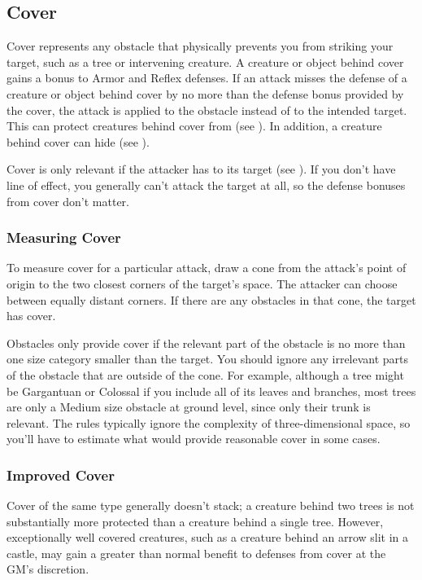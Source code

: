     \subsection{Cover}\label{Cover}

        Cover represents any obstacle that physically prevents you from striking your target, such as a tree or intervening creature.
        A creature or object behind cover gains a  bonus to Armor and Reflex defenses.
        If an attack misses the defense of a creature or object behind cover by no more than the defense bonus provided by the cover,
            the attack is applied to the obstacle instead of to the intended target.
        This can protect creatures behind cover from  (see ).
        In addition, a creature behind cover can hide (see ).

        Cover is only relevant if the attacker has  to its target (see ).
        If you don't have line of effect, you generally can't attack the target at all, so the defense bonuses from cover don't matter.

        \subsubsection{Measuring Cover}
            To measure cover for a particular attack, draw a cone from the attack's point of origin to the two closest corners of the target's space.
            The attacker can choose between equally distant corners.
            If there are any obstacles in that cone, the target has cover.

            Obstacles only provide cover if the relevant part of the obstacle is no more than one size category smaller than the target.
            You should ignore any irrelevant parts of the obstacle that are outside of the cone.
            For example, although a tree might be Gargantuan or Colossal if you include all of its leaves and branches, most trees are only a Medium size obstacle at ground level, since only their trunk is relevant.
            The rules typically ignore the complexity of three-dimensional space, so you'll have to estimate what would provide reasonable cover in some cases.

            \subsubsection{Improved Cover}
            Cover of the same type generally doesn't stack; a creature behind two trees is not substantially more protected than a creature behind a single tree.
            However, exceptionally well covered creatures, such as a creature behind an arrow slit in a castle, may gain a greater than normal benefit to defenses from cover at the GM's discretion.

